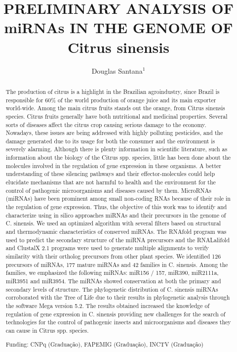 \documentclass[twoside]{article}
\title{\vspace{-15mm}\fontsize{24pt}{10pt}\selectfont\textbf{PRELIMINARY ANALYSIS OF miRNAs IN THE GENOME OF Citrus sinensis}} %
\author{Douglas Santana$^1$}
\affil{1 UFU\\ }
\date{}
\begin{document}
\maketitle %

\thispagestyle{fancy} %


\begin{abstract}
The production of citrus is a highlight in the Brazilian agroindustry, since Brazil is responsible for 60\% of the world production of orange juice and its main exporter world-wide. Among the main citrus fruits stands out the orange, from Citrus sinensis species. Citrus fruits generally have both nutritional and medicinal properties. Several sorts of diseases affect the citrus crop causing serious damage to the economy. Nowadays, these issues are being addressed with highly polluting pesticides, and the damage generated due to its usage for both the consumer and the environment is severely alarming. Although there is plenty information in scientific literature, such as information about the biology of the Citrus spp. species, little has been done about the molecules involved in the regulation of gene expression in these organisms. A better understanding of these silencing pathways and their effector-molecules could help elucidate mechanisms that are not harmful to health and the environment for the control of pathogenic microorganisms and diseases caused by them. MicroRNAs (miRNAs) have been prominent among small non-coding RNAs because of their role in the regulation of gene expression. Thus, the objective of this work was to identify and characterize using in silico approaches miRNAs and their precursors in the genome of C. sinensis. We used an optimized algorithm with several filters based on structural and thermodynamic characteristics of conserved miRNAs. The RNAfold program was used to predict the secondary structure of the miRNA precursors and the RNALalifold and ClustalX 2.1 programs were used to generate multiple alignments to verify similarity with their ortholog precursors from other plant species. We identified 126 precursors of miRNAs, 177 mature miRNAs and 42 families in C. sinensis. Among the families, we emphasized the following miRNAs: miR156 / 157, miR390, miR2111a, miR3951 and miR3954. The miRNAs showed conservation at both the primary and secondary levels of structure. The phylogenetic distribution of C. sinensis miRNAs corroborated with the Tree of Life due to their results in phylogenetic analysis through the software Mega version 5.2. The results obtained increased the knowledge of regulation of gene expression in C. sinensis providing new challenges for the search of technologies for the control of pathogenic insects and microorganisms and diseases they can cause in Citrus spp. species.

Funding: CNPq (Gradua\c{c}\~ao), FAPEMIG (Gradua\c{c}\~ao), INCTV (Gradua\c{c}\~ao)
\end{abstract}
\end{document}
